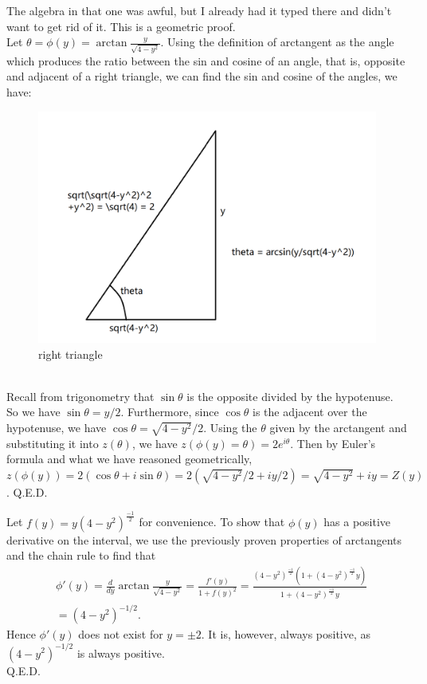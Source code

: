 \documentclass{article}
\theoremstyle{definition}
\newcommand{\cs}[1]{\color{blue}{#1}\normalcolor}
\begin{document}
 The algebra in that one was awful, but I already had it typed there and didn't want to get rid of it. This is a geometric proof.\\
Let $\theta = \phi(y) = \arctan{\frac{y}{\sqrt{4-y^2}}}$. Using the definition of arctangent as the angle which produces the ratio between the sin and cosine of an angle, that is, opposite and adjacent of a right triangle, we can find the sin and cosine of the angles, we have:
\begin{figure}[htbp]
\centerline{\includegraphics[scale=0.5]{triangle.png}}
\caption{right triangle}
\label{fig}
\end{figure}\\
Recall from trigonometry that $\sin\theta$ is the opposite divided by the hypotenuse. So we have $\sin\theta = y/2$. Furthermore, since $\cos\theta$ is the adjacent over the hypotenuse, we have $\cos\theta = \sqrt{4-y^2}/2$. Using the $\theta$ given by the arctangent and substituting it into $z(\theta)$, we have $z(\phi(y) = \theta) = 2e^{i\theta}$. Then by Euler's formula and what we have reasoned geometrically, $z(\phi(y)) = 2(\cos\theta + i\sin\theta) = 2(\sqrt{4-y^2}/2 + iy/2) = \sqrt{4-y^2} +iy = Z(y)$.
Q.E.D.\\

\cs{5/5}

Let $f(y) = y(4-y^2)^{\frac{-1}{2}}$ for convenience. To show that $\phi(y)$ has a positive derivative on the interval, we use the previously proven properties of arctangents and the chain rule to find that 
$$\begin{array}{cc}
     & \phi'(y) = \frac{d}{dy}\arctan{\frac{y}{\sqrt{4-y^2}}} = \frac{f'(y)}{1+f(y)^2} = \frac{(4-y^2)^{\frac{-1}{2}}(1+(4-y^2)^{\frac{-1}{2}}y)}{1+(4-y^2)^{\frac{-1}{2}}y}\\
     & = (4-y^2)^{-1/2}.
\end{array}$$
Hence $\phi'(y)$ does not exist for $y = \pm 2$. It is, however, always positive, as $(4-y^2)^{-1/2}$ is always positive.\\
Q.E.D.
\end{document}
